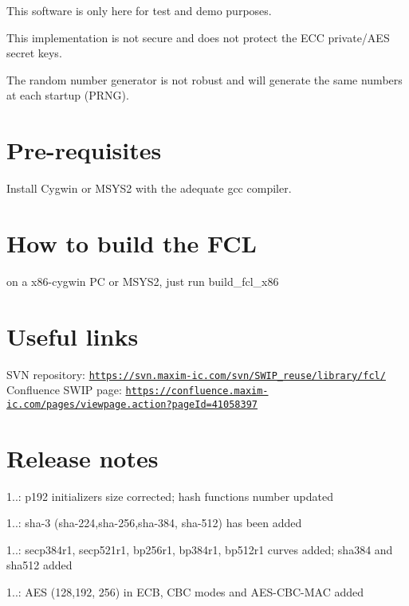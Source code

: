 \begin{DoxyItemize}
\item This software is only here for test and demo purposes.
\item This implementation is not secure and does not protect the E\+CC private/\+A\+ES secret keys.
\item The random number generator is not robust and will generate the same numbers at each startup (P\+R\+NG).
\end{DoxyItemize}\hypertarget{index_Req}{}\section{Pre-\/requisites}\label{index_Req}
Install Cygwin or M\+S\+Y\+S2 with the adequate gcc compiler.\hypertarget{index_Build}{}\section{How to build the F\+CL}\label{index_Build}
on a x86-\/cygwin PC or M\+S\+Y\+S2, just run build\+\_\+fcl\+\_\+x86\hypertarget{index_Links}{}\section{Useful links}\label{index_Links}
S\+VN repository\+: \href{https://svn.maxim-ic.com/svn/SWIP_reuse/library/fcl/}{\tt https\+://svn.\+maxim-\/ic.\+com/svn/\+S\+W\+I\+P\+\_\+reuse/library/fcl/} Confluence S\+W\+IP page\+: \href{https://confluence.maxim-ic.com/pages/viewpage.action?pageId=41058397}{\tt https\+://confluence.\+maxim-\/ic.\+com/pages/viewpage.\+action?page\+Id=41058397}\hypertarget{index_ReleaseNotes}{}\section{Release notes}\label{index_ReleaseNotes}

\begin{DoxyItemize}
\item 1..\+: p192 initializers size corrected; hash functions number updated
\item 1..\+: sha-\/3 (sha-\/224,sha-\/256,sha-\/384, sha-\/512) has been added
\item 1..\+: secp384r1, secp521r1, bp256r1, bp384r1, bp512r1 curves added; sha384 and sha512 added
\item 1..\+: A\+ES (128,192, 256) in E\+CB, C\+BC modes and A\+E\+S-\/\+C\+B\+C-\/\+M\+AC added 
\end{DoxyItemize}